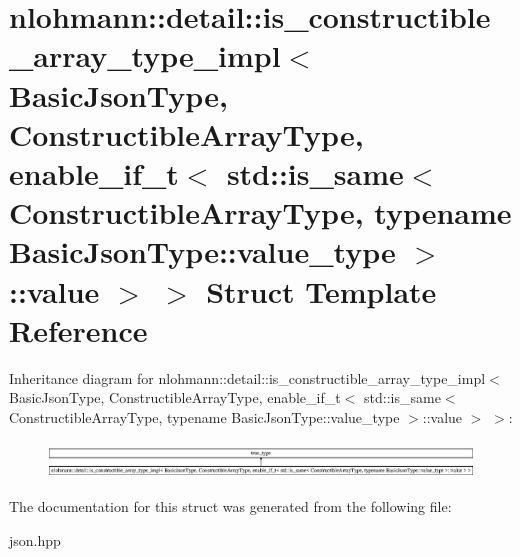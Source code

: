 \hypertarget{structnlohmann_1_1detail_1_1is__constructible__array__type__impl_3_01BasicJsonType_00_01Construce6fa33688da703b95649da4749cdeb98}{}\section{nlohmann\+:\+:detail\+:\+:is\+\_\+constructible\+\_\+array\+\_\+type\+\_\+impl$<$ Basic\+Json\+Type, Constructible\+Array\+Type, enable\+\_\+if\+\_\+t$<$ std\+:\+:is\+\_\+same$<$ Constructible\+Array\+Type, typename Basic\+Json\+Type\+:\+:value\+\_\+type $>$\+:\+:value $>$ $>$ Struct Template Reference}
\label{structnlohmann_1_1detail_1_1is__constructible__array__type__impl_3_01BasicJsonType_00_01Construce6fa33688da703b95649da4749cdeb98}
Inheritance diagram for nlohmann\+:\+:detail\+:\+:is\+\_\+constructible\+\_\+array\+\_\+type\+\_\+impl$<$ Basic\+Json\+Type, Constructible\+Array\+Type, enable\+\_\+if\+\_\+t$<$ std\+:\+:is\+\_\+same$<$ Constructible\+Array\+Type, typename Basic\+Json\+Type\+:\+:value\+\_\+type $>$\+:\+:value $>$ $>$\+:\begin{figure}[H]
\begin{center}
\leavevmode
\includegraphics[height=0.985915cm]{structnlohmann_1_1detail_1_1is__constructible__array__type__impl_3_01BasicJsonType_00_01Construce6fa33688da703b95649da4749cdeb98}
\end{center}
\end{figure}


The documentation for this struct was generated from the following file\+:\begin{DoxyCompactItemize}
\item 
json.\+hpp\end{DoxyCompactItemize}

